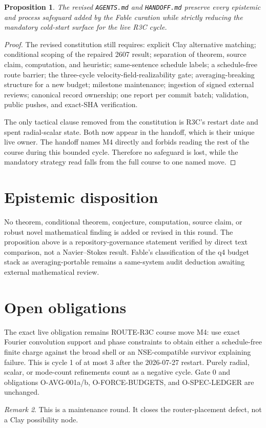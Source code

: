 \documentclass[11pt]{article}
\newtheorem{proposition}{Proposition}
\theoremstyle{remark}
\newtheorem{remark}[proposition]{Remark}
\begin{document}
\begin{proposition}
The revised \texttt{AGENTS.md} and \texttt{HANDOFF.md} preserve every
epistemic and process safeguard added by the Fable curation while
strictly reducing the mandatory cold-start surface for the live R3C
cycle.
\end{proposition}

\begin{proof}
The revised constitution still requires: explicit Clay alternative
matching; conditional scoping of the repaired 2607 result; separation
of theorem, source claim, computation, and heuristic; same-sentence
schedule labels; a schedule-free route barrier; the three-cycle
velocity-field-realizability gate; averaging-breaking structure for a
new budget; milestone maintenance; ingestion of signed external
reviews; canonical record ownership; one report per commit batch;
validation, public pushes, and exact-SHA verification.

The only tactical clause removed from the constitution is R3C's restart
date and spent radial-scalar state.  Both now appear in the handoff,
which is their unique live owner.  The handoff names M4 directly and
forbids reading the rest of the course during this bounded cycle.
Therefore no safeguard is lost, while the mandatory strategy read falls
from the full course to one named move.
\end{proof}

\section{Epistemic disposition}

No theorem, conditional theorem, conjecture, computation, source claim,
or robust novel mathematical finding is added or revised in this
round.  The proposition above is a repository-governance statement
verified by direct text comparison, not a Navier--Stokes result.
Fable's classification of the q4 budget stack as averaging-portable
remains a same-system audit deduction awaiting external mathematical
review.

\section{Open obligations}

The exact live obligation remains ROUTE-R3C course move M4: use exact
Fourier convolution support and phase constraints to obtain either a
schedule-free finite charge against the broad shell or an
NSE-compatible survivor explaining failure.  This is cycle 1 of at
most 3 after the 2026-07-27 restart.  Purely radial, scalar, or
mode-count refinements count as a negative cycle.  Gate 0 and
obligations O-AVG-001a/b, O-FORCE-BUDGETS, and O-SPEC-LEDGER are
unchanged.

\begin{remark}
This is a maintenance round.  It closes the router-placement defect,
not a Clay possibility node.
\end{remark}
\end{document}
